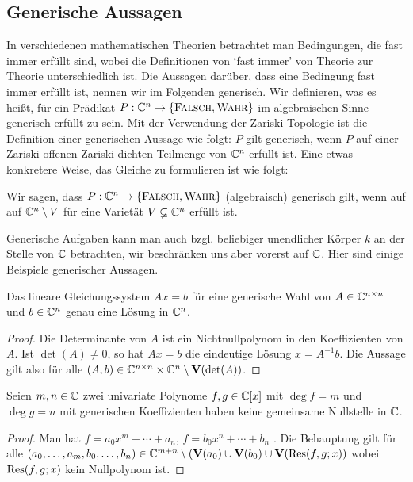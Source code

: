 \documentclass[11pt]{article}
\numberwithin{equation}{section}
\begin{document}
\subsection{Generische Aussagen} 

In verschiedenen mathematischen Theorien betrachtet man Bedingungen, die fast immer erfüllt sind, wobei die Definitionen von `fast immer'  von Theorie zur Theorie unterschiedlich ist. Die Aussagen darüber, dass eine Bedingung fast immer erfüllt ist, nennen wir im Folgenden generisch. Wir definieren, was es heißt, für ein Prädikat $P : \mathbb{C}^n \to \{\mathop{\text{\textsc{Falsch}}},\mathop{\text{\textsc{Wahr}}}\}$ im algebraischen Sinne generisch erfüllt zu sein. Mit der Verwendung der Zariski-Topologie ist die Definition einer generischen Aussage wie folgt: $P$ gilt generisch, wenn $P$ auf  einer Zariski-offenen Zariski-dichten Teilmenge von $\mathbb{C}^n$ erfüllt ist. Eine etwas konkretere Weise, das Gleiche zu formulieren ist wie folgt: 

\begin{definition} 
	Wir sagen, dass $P : \mathbb{C}^n \to \{\mathop{\text{\textsc{Falsch}}}, \mathop{\text{\textsc{Wahr}}}\}$ (algebraisch) generisch gilt, wenn auf auf $\mathbb{C}^n \setminus V$ für eine Varietät $V \varsubsetneq \mathbb{C}^n$ erfüllt ist. 
\end{definition} 

Generische Aufgaben kann man auch bzgl. beliebiger unendlicher Körper $k$ an der Stelle von $\mathbb{C}$ betrachten, wir beschränken uns aber vorerst auf $\mathbb{C}$. Hier sind einige Beispiele generischer Aussagen. 

\begin{proposition}
	Das lineare Gleichungssystem $A x =b$ für eine generische Wahl von  $A \in \mathbb{C}^{n \times n}$ und $b \in \mathbb{C}^n$ genau eine Lösung in $\mathbb{C}^n$. 
\end{proposition}  
\begin{proof} 
	Die Determinante von $A$ ist ein Nichtnullpolynom in den Koeffizienten von $A$. Ist $\det(A) \ne 0$, so hat $A x = b$ die eindeutige Lösung $x = A^{-1} b$. Die Aussage gilt also für alle $(A,b) \in \mathbb{C}^{n \times n} \times \mathbb{C}^n \setminus \mathbf{V}(\det(A))$.  
\end{proof} 

\begin{proposition} 
	Seien $m, n \in \mathbb{C}$ zwei univariate Polynome $f, g \in \mathbb{C}[x]$ mit $\deg f = m$ und $\deg g = n$ mit generischen Koeffizienten haben keine gemeinsame Nullstelle in $\mathbb{C}$.  
\end{proposition} 
\begin{proof} 
	Man hat $f = a_0 x^m + \cdots + a_n$, $f = b_0 x^n + \cdots + b_n$ . 
	Die Behauptung gilt für alle $(a_0,\ldots,a_m,b_0,\ldots,b_n) \in \mathbb{C}^{m +n} \setminus ( \mathbf{V}(a_0) \cup \mathbf{V}(b_0) \cup \mathbf{V}(\operatorname{Res}(f,g;x))$ wobei $\operatorname{Res}(f,g;x)$ kein Nullpolynom ist. 
\end{proof} 
\end{document}
